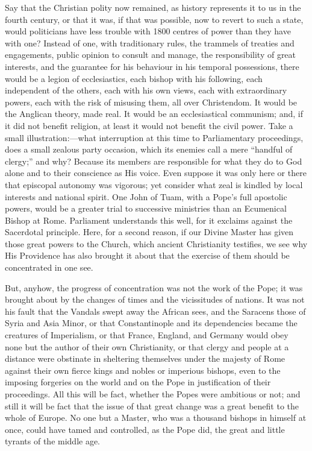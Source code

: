 Say that the Christian polity now remained, as history represents it
to us in the fourth century, or that it was, if that was possible, now
to revert to such a state, would politicians have less trouble with 1800
centres of power than they have with one? Instead of one, with
traditionary rules, the trammels of treaties and engagements, public
opinion to consult and manage, the responsibility of great interests,
and the guarantee for his behaviour in his temporal possessions, there
would be a legion of ecclesiastics, each bishop with his
following, each independent of the others, each with his own views, each
with extraordinary powers, each with the risk of misusing them, all over
Christendom. It would be the Anglican theory, made real. It would be an
ecclesiastical communism; and, if it did not benefit religion, at least
it would not benefit the civil power. Take a small illustration:—what
interruption at this time to Parliamentary proceedings, does a small
zealous party occasion, which its enemies call a mere ``handful of
clergy;'' and why? Because its members are responsible for what they
do to God alone and to their conscience as His voice. Even suppose it
was only here or there that episcopal autonomy was vigorous; yet
consider what zeal is kindled by local interests and national spirit.
One John of Tuam, with a Pope's full apostolic powers, would be a
greater trial to successive ministries than an Ecumenical Bishop at
Rome. Parliament understands this well, for it exclaims against the
Sacerdotal principle. Here, for a second reason, if our Divine Master
has given those great powers to the Church, which ancient Christianity
testifies, we see why His Providence has also brought it about that the
exercise of them should be concentrated in one see.

But, anyhow, the progress of concentration was not the work of the
Pope; it was brought about by the changes of times and the vicissitudes
of nations. It was not his fault that the Vandals swept away the African
sees, and the Saracens those of Syria and Asia Minor, or that
Constantinople and its dependencies became the creatures of Imperialism,
or that France, England, and Germany would obey none but the
author of their own Christianity, or that clergy and people at a
distance were obstinate in sheltering themselves under the majesty of
Rome against their own fierce kings and nobles or imperious bishops,
even to the imposing forgeries on the world and on the Pope in
justification of their proceedings. All this will be fact, whether the
Popes were ambitious or not; and still it will be fact that the issue of
that great change was a great benefit to the whole of Europe. No one but
a Master, who was a thousand bishops in himself at once, could have
tamed and controlled, as the Pope did, the great and little tyrants of
the middle age.

